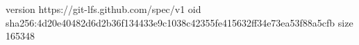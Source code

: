 version https://git-lfs.github.com/spec/v1
oid sha256:4d20e40482d6d2b36f134433e9c1038c42355fe415632ff34e73ea53f88a5cfb
size 165348
